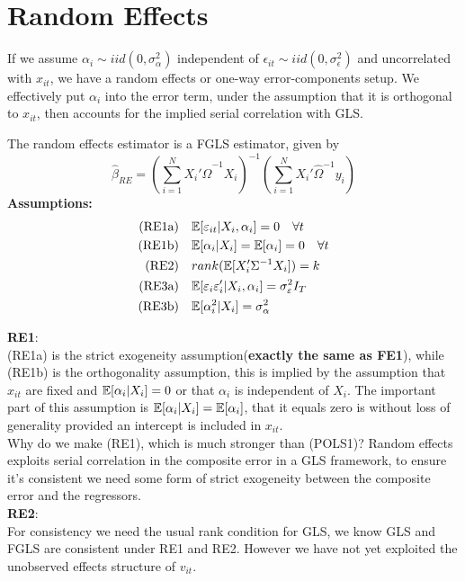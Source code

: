 \documentclass[DIV=14,titlepage=false]{scrreprt}
\begin{document}
\section{Random Effects}
If we assume $\alpha_i \sim iid(0, \sigma^2_{\alpha})$ independent of $\epsilon_{it} \sim iid(0, \sigma^2_{\epsilon})$ and uncorrelated with $x_{it}$, we have a random effects or one-way error-components setup. We effectively put $\alpha_i$ into the error term, under the assumption that it is orthogonal to $x_{it}$, then accounts for the implied serial correlation with GLS.
\begin{definition}
    The random effects estimator is a FGLS estimator, given by
    \[
        \hat \beta_{RE} = \left(\sum_{i=1}^N X_i' \hat \Omega^{-1} X_i\right)^{-1}\left(\sum_{i=1}^N X_i' \hat \Omega^{-1} y_i\right)
    \]
    \textbf{Assumptions:}
    \begin{align*}
        \text{(RE1a)} \quad & \mathbb{E}[\varepsilon_{it}|X_i, \alpha_i]= 0 \quad \forall t \\
        \text{(RE1b)} \quad &\mathbb{E}[\alpha_i|X_i]= \mathbb{E}[\alpha_i] = 0 \quad \forall t\\
        \text{(RE2)} \quad &rank(\mathbb{E}[X_i'\Sigma^{-1}X_i]) = k \\
        \text{(RE3a)} \quad &\mathbb{E}[\varepsilon_{i}\varepsilon_{i}'|X_i, \alpha_i] = \sigma^2_{\varepsilon}I_T \\
        \text{(RE3b)} \quad & \mathbb{E}[\alpha_i^2|X_i] = \sigma^2_{\alpha}
    \end{align*}
\end{definition}
\textbf{RE1}:\\
(RE1a) is the strict exogeneity assumption(\textbf{exactly the same as FE1}), while (RE1b) is the orthogonality assumption, this is implied by the assumption that $x_{it}$ are fixed and $\mathbb{E}[\alpha_i|X_i] = 0$ or that $\alpha_i$ is independent of $X_i$. The important part of this assumption is $\mathbb{E}[\alpha_i|X_i] = \mathbb{E}[\alpha_i]$, that it equals zero is without loss of generality provided an intercept is included in $x_{it}$.\\
Why do we make (RE1), which is much stronger than (POLS1)? Random effects exploits serial correlation in the composite error in a GLS framework, to ensure it's consistent we need some form of strict exogeneity between the composite error and the regressors.\\
\textbf{RE2}:\\
For consistency we need the usual rank condition for GLS, we know GLS and FGLS are consistent under RE1 and RE2. However we have not yet exploited the unobserved effects structure of $v_{it}$.\\
\end{document}
